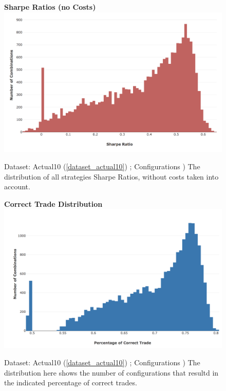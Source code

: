 \documentclass[a4paper,11pt,oneside]{article}
\theoremstyle{plain}
\theoremstyle{definition}
\begin{document}
	\begin{figure}[H]
		\centering
		\textbf{Sharpe Ratios (no Costs)}
		\includegraphics[scale=0.35]{images/results/mms/sharpe_ratios.png} 
		\caption[Sharpe Ratios (no Costs)]{Dataset: Actual10 (\ref{dataset_actual10}) ; Configurations )
			\newline The distribution of all strategies Sharpe Ratios, without costs taken into account.}
		\label{figure-sharpe_ratios}
	\end{figure}
	
	\begin{figure}[H]
		\centering
		\textbf{Correct Trade Distribution}
		\includegraphics[scale=0.35]{images/results/mms/confusion_dist.png} 
		\caption[Correct Trade Distribution]{Dataset: Actual10 (\ref{dataset_actual10}) ; Configurations )
			\newline The distribution here shows the number of configurations that resultd in the indicated percentage of correct trades.}
		\label{figure-confusion_dist}
	\end{figure}
	
\end{document}
